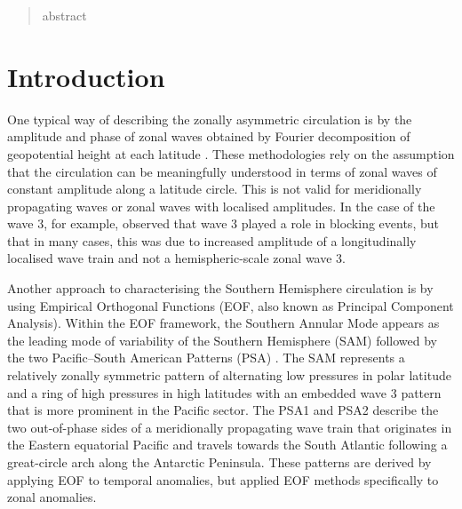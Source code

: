 \documentclass[smallextended]{svjour3}       %
\begin{document}
\maketitle

\begin{abstract}
abstract
\\
\keywords{
         \and
    }


\end{abstract}


\def\spacingset#1{\renewcommand{\baselinestretch}%
{#1}\small\normalsize} \spacingset{1}


\hypertarget{introduction}{%
\section{Introduction}\label{introduction}}

One typical way of describing the zonally asymmetric circulation is by the amplitude and phase of zonal waves obtained by Fourier decomposition of geopotential height at each latitude \citep[e.g.][]{vanloon1972, trenberth1980}. These methodologies rely on the assumption that the circulation can be meaningfully understood in terms of zonal waves of constant amplitude along a latitude circle. This is not valid for meridionally propagating waves or zonal waves with localised amplitudes. In the case of the wave 3, for example, \citet{trenberth1985} observed that wave 3 played a role in blocking events, but that in many cases, this was due to increased amplitude of a longitudinally localised wave train and not a hemispheric-scale zonal wave 3.

Another approach to characterising the Southern Hemisphere circulation is by using Empirical Orthogonal Functions (EOF, also known as Principal Component Analysis). Within the EOF framework, the Southern Annular Mode appears as the leading mode of variability of the Southern Hemisphere (SAM) \citep{fogt2020} followed by the two Pacific--South American Patterns (PSA) \citep{mo2001}. The SAM represents a relatively zonally symmetric pattern of alternating low pressures in polar latitude and a ring of high pressures in high latitudes with an embedded wave 3 pattern that is more prominent in the Pacific sector. The PSA1 and PSA2 describe the two out-of-phase sides of a meridionally propagating wave train that originates in the Eastern equatorial Pacific and travels towards the South Atlantic following a great-circle arch along the Antarctic Peninsula. These patterns are derived by applying EOF to temporal anomalies, but \citet{raphael2003} applied EOF methods specifically to zonal anomalies.
\end{document}
